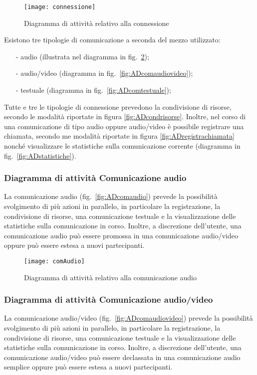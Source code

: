 \begin{figure}[H]
  \centering
  \texttt{[image: connessione]}
  \caption{Diagramma di attività relativo alla connessione}\label{fig:ADconnessione}
\end{figure}

Esistono tre tipologie di comunicazione a seconda del mezzo utilizzato:
\begin{itemize}[noitemsep,nolistsep]
  \item[-] audio (illustrata nel diagramma in fig.~\ref{fig:ADcomaudio});
  \item[-] audio/video (diagramma in fig.~\ref{fig:ADcomaudiovideo});
  \item[-] testuale (diagramma in fig.~\ref{fig:ADcomtestuale});
\end{itemize}


Tutte e tre le tipologie di connessione prevedono la condivisione di risorse, secondo le modalità riportate in figura \ref{fig:ADcondrisorse}. Inoltre, nel corso di una comunicazione di tipo audio oppure audio/video è possibile registrare una chiamata, secondo me modalità riportate in figura \ref{fig:ADregistrachiamata} nonché visualizzare le statistiche sulla comunicazione corrente (diagramma in fig.~\vref{fig:ADstatistiche}).

\subsubsection{Diagramma di attività Comunicazione audio}
La comunicazione audio (fig.~\vref{fig:ADcomaudio}) prevede la possibilità svolgimento di più azioni in parallelo, in particolare la registrazione, la condivisione di risorse, una comunicazione testuale e la visualizzazione delle statistiche sulla comunicazione in corso. Inoltre, a discrezione dell'utente, una comunicazione audio può essere promossa in una comunicazione audio/video oppure può essere estesa a nuovi partecipanti.

\begin{figure}[H]
  \centering
  \texttt{[image: comAudio]}
  \caption{Diagramma di attività relativo alla comunicazione audio}\label{fig:ADcomaudio}
\end{figure}

\subsubsection{Diagramma di attività Comunicazione audio/video}
La comunicazione audio/video (fig.~\vref{fig:ADcomaudiovideo}) prevede la possibilità svolgimento di più azioni in parallelo, in particolare la registrazione, la condivisione di risorse, una comunicazione testuale e la visualizzazione delle statistiche sulla comunicazione in corso. Inoltre, a discrezione dell'utente, una comunicazione audio/video può essere declassata in una comunicazione audio semplice oppure può essere estesa a nuovi partecipanti.


